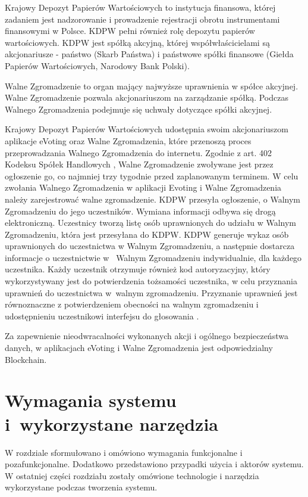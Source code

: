 \documentclass[a4paper,12pt]{book}
\begin{document}
Krajowy Depozyt Papierów Wartościowych to instytucja finansowa, której zadaniem jest nadzorowanie i prowadzenie rejestracji obrotu instrumentami finansowymi w Polsce. KDPW pełni również rolę depozytu papierów wartościowych. KDPW jest spółką akcyjną, której współwłaścicielami są akcjonariusze - państwo (Skarb Państwa) i państwowe spółki finansowe (Giełda Papierów Wartościowych, Narodowy Bank Polski).

Walne Zgromadzenie to organ mający najwyższe uprawnienia w spółce akcyjnej. Walne Zgromadzenie pozwala akcjonariuszom na zarządzanie spółką. Podczas Walnego Zgromadzenia podejmuje się uchwały dotyczące spółki akcyjnej.

Krajowy Depozyt Papierów Wartościowych udostępnia swoim akcjonariuszom aplikacje eVoting oraz Walne Zgromadzenia, które przenoszą proces przeprowadzania Walnego Zgromadzenia do internetu. Zgodnie z art. 402 Kodeksu Spółek Handlowych \cite{sp-han}, Walne Zgromadzenie zwoływane jest przez ogłoszenie go, co najmniej trzy tygodnie przed zaplanowanym terminem. W celu zwołania Walnego Zgromadzenia w aplikacji Evoting i Walne Zgromadzenia należy zarejestrować walne zgromadzenie. KDPW przesyła ogłoszenie, o Walnym Zgromadzeniu do jego uczestników. Wymiana informacji odbywa się drogą elektroniczną.
Uczestnicy tworzą listę osób uprawnionych do udziału w Walnym Zgromadzeniu, która jest przesyłana do KDPW. KDPW generuje wykaz osób uprawnionych do uczestnictwa w Walnym Zgromadzeniu, a następnie dostarcza informacje o uczestnictwie w~ Walnym Zgromadzeniu indywidualnie, dla każdego uczestnika. Każdy uczestnik otrzymuje również kod autoryzacyjny, który wykorzystywany jest do potwierdzenia tożsamości uczestnika, w celu przyznania uprawnień do uczestnictwa w~walnym zgromadzeniu. Przyznanie uprawnień jest równoznaczne z potwierdzeniem obecności na walnym zgromadzeniu i udostępnieniu uczestnikowi interfejsu do głosowania \cite{eVoting-dzialanie}.

Za zapewnienie nieodwracalności wykonanych akcji i ogólnego bezpieczeństwa danych, w aplikacjach eVoting i Walne Zgromadzenia jest odpowiedzialny Blockchain.

\chapter{Wymagania systemu i~wykorzystane narzędzia}
W rozdziale sformułowano i omówiono wymagania funkcjonalne i pozafunkcjonalne. Dodatkowo przedstawiono przypadki użycia i aktorów systemu. W ostatniej części rozdziału zostały omówione technologie i narzędzia wykorzystane podczas tworzenia systemu.
\end{document}
